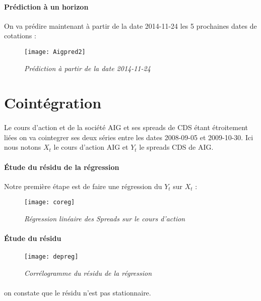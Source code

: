     \paragraph{Prédiction à un horizon} 
        On va prédire maintenant à partir de la date 2014-11-24 les 5 prochaines
        dates de cotations :
        \begin{figure}[H]
            \centering 
            \label{fig:Aigpred2} 
            \texttt{[image: Aigpred2]} 
            \caption{\it Prédiction à partir de la date 2014-11-24 } 
        \end{figure} 
        \section{Cointégration}
    \paragraph{} Le cours d'action et de la société AIG et ses spreads de CDS étant
    étroitement liées on va cointegrer ses deux séries entre les dates
    2008-09-05 et 2009-10-30. Ici nous notons $X_t$ le cours d'action AIG et
    $Y_t$ le spreads CDS de AIG.
    \paragraph{Étude du résidu de la régression} Notre première étape est de faire
    une régression du $Y_t$ sur $X_t$ :
    \begin{figure}[H]
        \centering 
        \label{fig:coreg} 
        \texttt{[image: coreg]} 
        \caption{\it Régression linéaire des Spreads sur le cours d'action } 
    \end{figure}
    \paragraph{Étude du résidu}
    \begin{figure}[H]
          \centering 
         \label{fig:depreg} 
          \texttt{[image: depreg]} 
          \caption{\it Corrélogramme du résidu de la régression } 
            \end{figure} 
             
            \paragraph{} on constate que le résidu n'est pas stationnaire.

